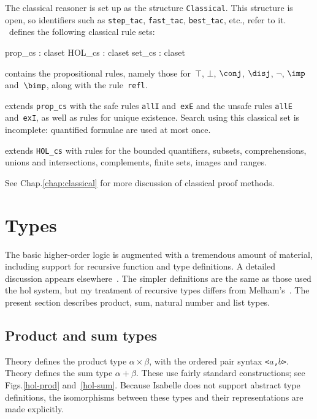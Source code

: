 The classical reasoner is set up as the structure
{\tt Classical}.  This structure is open, so {\ML} identifiers such
as {\tt step_tac}, {\tt fast_tac}, {\tt best_tac}, etc., refer to it.
\HOL\ defines the following classical rule sets:
\begin{ttbox} 
prop_cs    : claset
HOL_cs     : claset
set_cs     : claset
\end{ttbox}
\begin{ttdescription}
\item[\ttindexbold{prop_cs}] contains the propositional rules, namely
those for~$\top$, $\bot$, $\conj$, $\disj$, $\neg$, $\imp$ and~$\bimp$,
along with the rule~{\tt refl}.

\item[\ttindexbold{HOL_cs}] extends {\tt prop_cs} with the safe rules
  {\tt allI} and~{\tt exE} and the unsafe rules {\tt allE}
  and~{\tt exI}, as well as rules for unique existence.  Search using
  this classical set is incomplete: quantified formulae are used at most
  once.

\item[\ttindexbold{set_cs}] extends {\tt HOL_cs} with rules for the bounded
  quantifiers, subsets, comprehensions, unions and intersections,
  complements, finite sets, images and ranges.
\end{ttdescription}
\noindent
See %
        {Chap.\ts\ref{chap:classical}} 
for more discussion of classical proof methods.


\section{Types}
The basic higher-order logic is augmented with a tremendous amount of
material, including support for recursive function and type definitions.  A
detailed discussion appears elsewhere~\cite{paulson-coind}.  The simpler
definitions are the same as those used the {\sc hol} system, but my
treatment of recursive types differs from Melham's~\cite{melham89}.  The
present section describes product, sum, natural number and list types.

\subsection{Product and sum types}
Theory  defines the product type $\alpha\times\beta$, with
the ordered pair syntax {\tt<$a$,$b$>}.  Theory  defines the
sum type $\alpha+\beta$.  These use fairly standard constructions; see
Figs.\ts\ref{hol-prod} and~\ref{hol-sum}.  Because Isabelle does not
support abstract type definitions, the isomorphisms between these types and
their representations are made explicitly.

